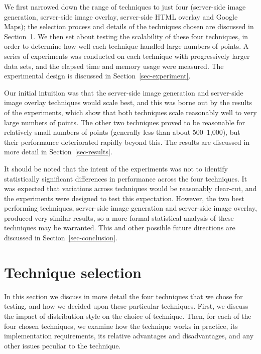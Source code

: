 \documentclass[acmnow]{acmtrans2m}
\begin{document}
We first narrowed down the range of techniques to just four (server-side
image generation, server-side image overlay, server-side HTML overlay
and Google Maps); the selection process and details of the techniques
chosen are discussed in Section~\ref{sec-techniques}. We then set about
testing the scalability of these four techniques, in order to determine
how well each technique handled large numbers of points. A series of
experiments was conducted on each technique with progressively larger
data sets, and the elapsed time and memory usage were measured. The
experimental design is discussed in Section~\ref{sec-experiment}.

Our initial intuition was that the server-side image generation and
server-side image overlay techniques would scale best, and this was
borne out by the results of the experiments, which show that both
techniques scale reasonably well to very large numbers of points. The
other two techniques proved to be reasonable for relatively small
numbers of points (generally less than about 500--1,000), but their
performance deteriorated rapidly beyond this. The results are discussed
in more detail in Section~\ref{sec-results}.

It should be noted that the intent of the experiments was not to
identify statistically significant differences in performance across the
four techniques. It was expected that variations across techniques would
be reasonably clear-cut, and the experiments were designed to test this
expectation. However, the two best performing techniques, server-side
image generation and server-side image overlay, produced very similar
results, so a more formal statistical analysis of these techniques may
be warranted. This and other possible future directions are discussed in
Section~\ref{sec-conclusion}.


\section{Technique selection}
\label{sec-techniques}

In this section we discuss in more detail the four techniques that we
chose for testing, and how we decided upon these particular techniques.
First, we discuss the impact of distribution style on the choice of
technique. Then, for each of the four chosen techniques, we examine how
the technique works in practice, its implementation requirements, its
relative advantages and disadvantages, and any other issues peculiar to
the technique.
\end{document}
